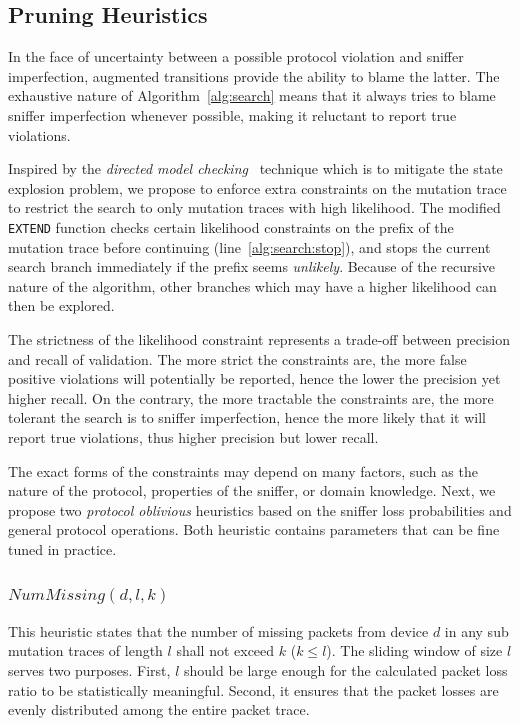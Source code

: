 \subsection{Pruning Heuristics}
\label{subsec:heuristic}

In the face of uncertainty between a possible
protocol violation and sniffer imperfection, augmented transitions provide the
ability to blame the latter. The exhaustive nature of
Algorithm~\ref{alg:search} means that it always tries to blame sniffer
imperfection whenever possible, making it reluctant to report true
violations.

Inspired by the \textit{directed model checking}~\cite{edelkamp2008survey}
technique which is to mitigate the state explosion problem, we propose to enforce extra
constraints on the mutation trace to restrict the search to only mutation traces
with high likelihood. The modified \texttt{EXTEND} function checks certain
likelihood constraints on the prefix of the mutation trace before continuing
(line~\ref{alg:search:stop}), and stops the current search branch immediately if
the prefix seems \textit{unlikely}.  Because of the recursive nature of the
algorithm, other branches which may have a higher likelihood can then be
explored.

The strictness of the likelihood constraint represents a trade-off between
precision and recall of validation. The more strict the constraints are, the
more false positive violations will potentially be reported, hence the lower the
precision yet higher recall. On the contrary, the more tractable the
constraints are, the more tolerant the search is to sniffer imperfection, hence
the more likely that it will report true violations, thus higher precision but
lower recall.

The exact forms of the constraints may depend on many factors, such as the
nature of the protocol, properties of the sniffer, or domain knowledge.  Next,
we propose two \textit{protocol oblivious} heuristics based on the sniffer loss
probabilities and general protocol operations. Both heuristic contains
parameters that can be fine tuned in practice.

\subsubsection{$\mathit{NumMissing}(d, l, k)$}

This heuristic states that the number of missing packets from device $d$ in any
sub mutation traces of length $l$ shall not exceed $k$ ($k \le l$).  The sliding
window of size $l$ serves two purposes. First, $l$ should be large enough for
the calculated packet loss ratio to be statistically meaningful.  Second, it
ensures that the packet losses are evenly distributed among the entire packet
trace.

